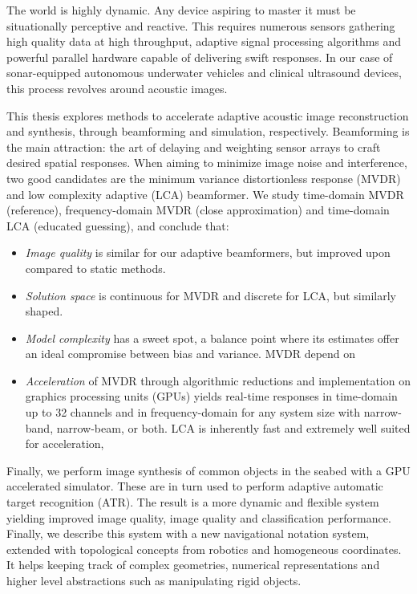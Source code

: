 
The world is highly dynamic. Any device aspiring to master it must be situationally perceptive and reactive. This requires numerous sensors gathering high quality data at high throughput, adaptive signal processing algorithms and powerful parallel hardware capable of delivering swift responses. In our case of sonar-equipped autonomous underwater vehicles and clinical ultrasound devices, this process revolves around acoustic images.

This thesis explores methods to accelerate adaptive acoustic image reconstruction and synthesis, through beamforming and simulation, respectively. Beamforming is the main attraction: the art of delaying and weighting sensor arrays to craft desired spatial responses. When aiming to minimize image noise and interference, two good candidates are the minimum variance distortionless response (MVDR) and low complexity adaptive (LCA) beamformer. We study time-domain MVDR (reference), frequency-domain MVDR (close approximation) and time-domain LCA (educated guessing), and conclude that:
%
\begin{itemize}
\item \emph{Image quality} is similar for our adaptive beamformers, but improved upon compared to static methods.
%
\item \emph{Solution space} is continuous for MVDR and discrete for LCA, but similarly shaped. 
%
\item \emph{Model complexity} has a sweet spot, a balance point where its estimates offer an ideal compromise between bias and variance. MVDR depend on 
%
\item \emph{Acceleration} of MVDR through algorithmic reductions and implementation on graphics processing units (GPUs) yields real-time responses in time-domain up to 32 channels and in frequency-domain for any system size with narrow-band, narrow-beam, or both. LCA is inherently fast and extremely well suited for acceleration, 
\end{itemize}
%
Finally, we perform image synthesis of common objects in the seabed with a GPU accelerated simulator. These are in turn used to perform adaptive automatic target recognition (ATR). The result is a more dynamic and flexible system yielding improved image quality, image quality and classification performance. Finally, we describe this system with a new navigational notation system, extended with topological concepts from robotics and homogeneous coordinates. It helps keeping track of complex geometries, numerical representations and higher level abstractions such as manipulating rigid objects.



